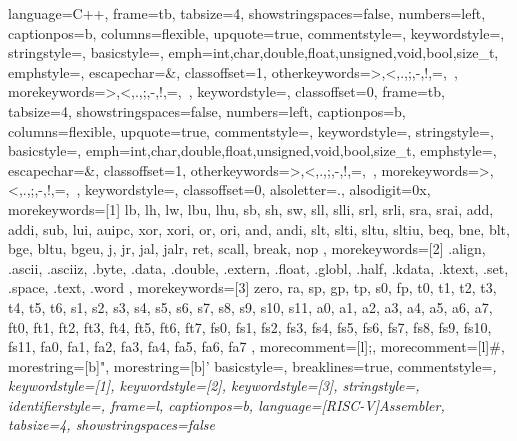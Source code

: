  {
    language=C++,
    frame=tb,
    tabsize=4,
    showstringspaces=false,
    numbers=left,
    captionpos=b,
    columns=flexible,
    upquote=true,
    commentstyle=\color{commentgreen},
    keywordstyle=\color{blue},
    stringstyle=\color{commentgreen},
    basicstyle=\small\ttfamily,
    emph={int,char,double,float,unsigned,void,bool,size\_t},
    emphstyle={\color{blue}},
    escapechar=\&,
    classoffset=1,
    otherkeywords={>,<,.,;,-,!,=,~},
    morekeywords={>,<,.,;,-,!,=,~},
    keywordstyle=\color{black},
    classoffset=0,
}
 {
    frame=tb,
    tabsize=4,
    showstringspaces=false,
    numbers=left,
    captionpos=b,
    columns=flexible,
    upquote=true,
    commentstyle=\color{black},
    keywordstyle=\color{black},
    stringstyle=\color{black},
    basicstyle=\small\ttfamily,
    emph={int,char,double,float,unsigned,void,bool,size\_t},
    emphstyle={\color{black}},
    escapechar=\&,
    classoffset=1,
    otherkeywords={>,<,.,;,-,!,=,~},
    morekeywords={>,<,.,;,-,!,=,~},
    keywordstyle=\color{black},
    classoffset=0,
}
{
    alsoletter={.}, %
    alsodigit={0x}, %
    morekeywords=[1]{ %
    lb, lh, lw, lbu, lhu,
    sb, sh, sw,
    sll, slli, srl, srli, sra, srai,
    add, addi, sub, lui, auipc,
    xor, xori, or, ori, and, andi,
    slt, slti, sltu, sltiu,
    beq, bne, blt, bge, bltu, bgeu,
    j, jr, jal, jalr, ret,
    scall, break, nop
},
    morekeywords=[2]{ %
    .align, .ascii, .asciiz, .byte, .data, .double, .extern,
    .float, .globl, .half, .kdata, .ktext, .set, .space, .text, .word
},
    morekeywords=[3]{ %
    zero, ra, sp, gp, tp, s0, fp,
    t0, t1, t2, t3, t4, t5, t6,
    s1, s2, s3, s4, s5, s6, s7, s8, s9, s10, s11,
    a0, a1, a2, a3, a4, a5, a6, a7,
    ft0, ft1, ft2, ft3, ft4, ft5, ft6, ft7,
    fs0, fs1, fs2, fs3, fs4, fs5, fs6, fs7, fs8, fs9, fs10, fs11,
    fa0, fa1, fa2, fa3, fa4, fa5, fa6, fa7
},
    morecomment=[l]{;},   %
    morecomment=[l]{\#},  %
    morestring=[b]",      %
    morestring=[b]'       %
}
 {
    basicstyle=\small\ttfamily,                    %
    breaklines=true,                              %
    commentstyle=\itshape\color{green!50!black},  %
    keywordstyle=[1]\color{blue!80!black},        %
    keywordstyle=[2]\color{orange!80!black},      %
    keywordstyle=[3]\color{red!50!black},         %
    stringstyle=\color{mauve},                    %
    identifierstyle=\color{teal},                 %
    frame=l,                                      %
    captionpos=b,
    language=[RISC-V]Assembler,                   %
    tabsize=4,                                    %
    showstringspaces=false                        %
}

